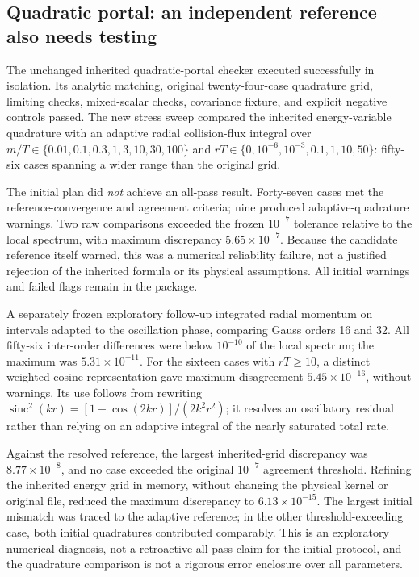 \subsection{Quadratic portal: an independent reference also needs testing}
The unchanged inherited quadratic-portal checker executed successfully in isolation. Its analytic matching, original twenty-four-case quadrature grid, limiting checks, mixed-scalar checks, covariance fixture, and explicit negative controls passed. The new stress sweep compared the inherited energy-variable quadrature with an adaptive radial collision-flux integral over $m/T\in\{0.01,0.1,0.3,1,3,10,30,100\}$ and $rT\in\{0,10^{-6},10^{-3},0.1,1,10,50\}$: fifty-six cases spanning a wider range than the original grid.

The initial plan did \emph{not} achieve an all-pass result. Forty-seven cases met the reference-convergence and agreement criteria; nine produced adaptive-quadrature warnings. Two raw comparisons exceeded the frozen $10^{-7}$ tolerance relative to the local spectrum, with maximum discrepancy $5.65\times10^{-7}$. Because the candidate reference itself warned, this was a numerical reliability failure, not a justified rejection of the inherited formula or its physical assumptions. All initial warnings and failed flags remain in the package.

A separately frozen exploratory follow-up integrated radial momentum on intervals adapted to the oscillation phase, comparing Gauss orders 16 and 32. All fifty-six inter-order differences were below $10^{-10}$ of the local spectrum; the maximum was $5.31\times10^{-11}$. For the sixteen cases with $rT\ge10$, a distinct weighted-cosine representation gave maximum disagreement $5.45\times10^{-16}$, without warnings. Its use follows from rewriting $\operatorname{sinc}^2(kr)=[1-\cos(2kr)]/(2k^2r^2)$; it resolves an oscillatory residual rather than relying on an adaptive integral of the nearly saturated total rate.

Against the resolved reference, the largest inherited-grid discrepancy was $8.77\times10^{-8}$, and no case exceeded the original $10^{-7}$ agreement threshold. Refining the inherited energy grid in memory, without changing the physical kernel or original file, reduced the maximum discrepancy to $6.13\times10^{-15}$. The largest initial mismatch was traced to the adaptive reference; in the other threshold-exceeding case, both initial quadratures contributed comparably. This is an exploratory numerical diagnosis, not a retroactive all-pass claim for the initial protocol, and the quadrature comparison is not a rigorous error enclosure over all parameters.

